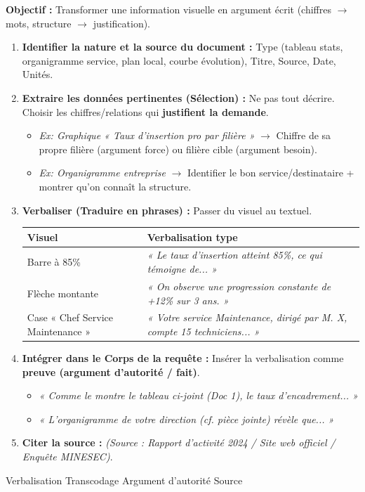 \documentclass[11pt]{article}
\newcommand{\cle}[1]{{\popxbold\color{popdark}#1}}
\begin{document}
\begin{methode}
\textbf{Objectif :} Transformer une information visuelle en argument écrit (chiffres $\rightarrow$ mots, structure $\rightarrow$ justification).
\begin{enumerate}
    \item \textbf{Identifier la nature et la source du document :} Type (tableau stats, organigramme service, plan local, courbe évolution), Titre, Source, Date, Unités.
    \item \textbf{Extraire les données pertinentes (Sélection) :} Ne pas tout décrire. Choisir les chiffres/relations qui \textbf{justifient la demande}.
    \begin{itemize}
        \item \emph{Ex: Graphique « Taux d'insertion pro par filière »} $\rightarrow$ Chiffre de sa propre filière (argument force) ou filière cible (argument besoin).
        \item \emph{Ex: Organigramme entreprise} $\rightarrow$ Identifier le bon service/destinataire + montrer qu'on connaît la structure.
    \end{itemize}
    \item \textbf{Verbaliser (Traduire en phrases) :} Passer du visuel au textuel.
    \begin{center}
        \begin{tabular}{|l|l|}
        \hline
        \textbf{Visuel} & \textbf{Verbalisation type} \\
        \hline
        Barre à 85\% & \emph{« Le taux d'insertion atteint 85\%, ce qui témoigne de... »} \\
        Flèche montante & \emph{« On observe une progression constante de +12\% sur 3 ans. »} \\
        Case « Chef Service Maintenance » & \emph{« Votre service Maintenance, dirigé par M. X, compte 15 techniciens... »} \\
        \hline
        \end{tabular}
    \end{center}
    \item \textbf{Intégrer dans le Corps de la requête :} Insérer la verbalisation comme \textbf{preuve (argument d'autorité / fait)}.
    \begin{itemize}
        \item \emph{« Comme le montre le tableau ci-joint (Doc 1), le taux d'encadrement... »}
        \item \emph{« L'organigramme de votre direction (cf. pièce jointe) révèle que... »}
    \end{itemize}
    \item \textbf{Citer la source :} \emph{(Source : Rapport d'activité 2024 / Site web officiel / Enquête MINESEC)}.
\end{enumerate}
\cle{Verbalisation} \cle{Transcodage} \cle{Argument d'autorité} \cle{Source}
\end{methode}
\end{document}
